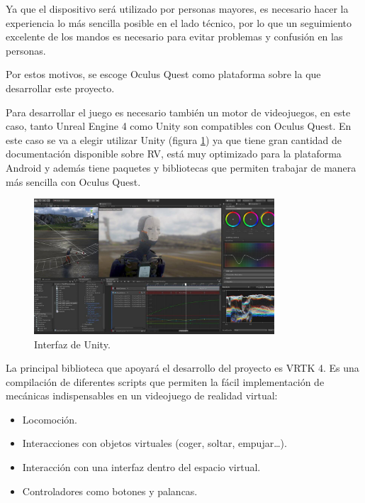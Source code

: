 Ya que el dispositivo será utilizado por personas mayores, es necesario hacer la experiencia lo más sencilla posible en el lado técnico, por lo que un seguimiento excelente de los mandos es necesario para evitar problemas y confusión en las personas.

Por estos motivos, se escoge Oculus Quest como plataforma sobre la que desarrollar este proyecto.



Para desarrollar el juego es necesario también un motor de videojuegos, en este caso, tanto Unreal Engine 4 como Unity son compatibles con Oculus Quest. En este caso se va a elegir utilizar Unity (figura \ref{fig:TU_interfazUnity}) ya que tiene gran cantidad de documentación disponible sobre RV, está muy optimizado para la plataforma Android y además tiene paquetes y bibliotecas que permiten trabajar de manera más sencilla con Oculus Quest.

\begin{figure}
  \centering
\includegraphics[width=0.8\textwidth]{03.EstudioProblema/03.TecnologiaAUsar/00.Figuras/02.interfaz_unity.jpg}
    \caption{Interfaz de Unity. \cite{EA_img_interfazUnity}}
    \label{fig:TU_interfazUnity}
\end{figure}

La principal biblioteca que apoyará el desarrollo del proyecto es VRTK 4. Es una compilación de diferentes scripts que permiten la fácil implementación de mecánicas indispensables en un videojuego de realidad virtual:

\begin{itemize}
	\item{Locomoción.}

	\item{Interacciones con objetos virtuales (coger, soltar, empujar…).}

	\item{Interacción con una interfaz dentro del espacio virtual.}
	
	\item{Controladores como botones y palancas.}

\end{itemize}


